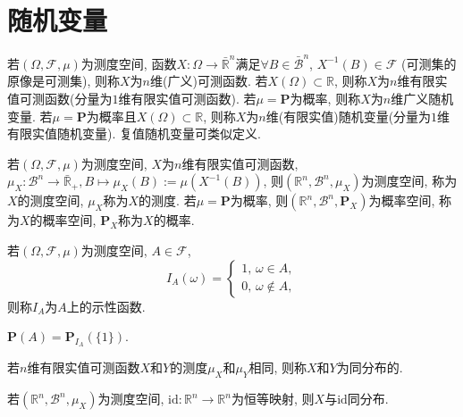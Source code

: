 \chapter{随机变量}

\begin{definition}
    若$(\Omega,\mathcal{F},\mu)$为测度空间, 函数$X\colon \Omega\to\bar{\mathbb{R}}^n$满足$\forall B \in \bar{\mathscr{B}}^n$, $X^{-1}(B)\in\mathcal{F}$ (可测集的原像是可测集), 则称$X$为$n$维(广义)可测函数. 若$X(\Omega)\subset \mathbb{R}$, 则称$X$为$n$维有限实值可测函数(分量为$1$维有限实值可测函数). 若$\mu=\mathbf{P}$为概率, 则称$X$为$n$维广义随机变量. 若$\mu=\mathbf{P}$为概率且$X(\Omega)\subset \mathbb{R}$, 则称$X$为$n$维(有限实值)随机变量(分量为$1$维有限实值随机变量). 复值随机变量可类似定义.
\end{definition}

\begin{definition}
    若$(\Omega,\mathcal{F},\mu)$为测度空间, $X$为$n$维有限实值可测函数, $\mu_X\colon {\mathscr{B}}^n\to \bar{\mathbb{R}}_+,B\mapsto\mu_X(B):=\mu(X^{-1}(B))$, 则$(\mathbb{R}^n,{\mathscr{B}}^n,\mu_X)$为测度空间, 称为$X$的测度空间, $\mu_X$称为$X$的测度. 若$\mu=\mathbf{P}$为概率, 则$(\mathbb{R}^n,{\mathscr{B}}^n,\mathbf{P}_X)$为概率空间, 称为$X$的概率空间, $\mathbf{P}_X$称为$X$的概率.
\end{definition}

\begin{definition}
    若$(\Omega,\mathcal{F},\mu)$为测度空间, $A\in\mathcal{F}$,
    \begin{equation}
        I_A(\omega)=\begin{cases}
            1,\,\omega\in A,\\
            0,\,\omega\notin A,
        \end{cases}
    \end{equation}
    则称$I_A$为$A$上的示性函数.
\end{definition}

\begin{theorem}
    $\mathbf{P}(A)=\mathbf{P}_{I_A}(\{1\})$.
\end{theorem}

\begin{definition}
    若$n$维有限实值可测函数$X$和$Y$的测度$\mu_X$和$\mu_Y$相同, 则称$X$和$Y$为同分布的.
\end{definition}

\begin{theorem}
    若$(\mathbb{R}^n,{\mathscr{B}}^n,\mu_X)$为测度空间, $\text{id}\colon \mathbb{R}^n\to{\mathbb{R} }^n$为恒等映射, 则$X$与$\text{id}$同分布.
\end{theorem}
